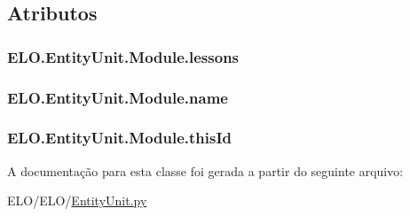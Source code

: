 \subsection{Atributos}
\hypertarget{classELO_1_1EntityUnit_1_1Module_a33eacfd2527f80841b87ccd73eb5fec0}{
\subsubsection[{lessons}]{\setlength{\rightskip}{0pt plus 5cm}E\-L\-O.\-Entity\-Unit.\-Module.\-lessons}}\label{classELO_1_1EntityUnit_1_1Module_a33eacfd2527f80841b87ccd73eb5fec0}
\hypertarget{classELO_1_1EntityUnit_1_1Module_a82adf3b2602714a4df5f0df535902854}{
\subsubsection[{name}]{\setlength{\rightskip}{0pt plus 5cm}E\-L\-O.\-Entity\-Unit.\-Module.\-name}}\label{classELO_1_1EntityUnit_1_1Module_a82adf3b2602714a4df5f0df535902854}
\hypertarget{classELO_1_1EntityUnit_1_1Module_a02fe16e41dd435364cb9073a8a805e96}{
\subsubsection[{this\-Id}]{\setlength{\rightskip}{0pt plus 5cm}E\-L\-O.\-Entity\-Unit.\-Module.\-this\-Id}}\label{classELO_1_1EntityUnit_1_1Module_a02fe16e41dd435364cb9073a8a805e96}


A documentação para esta classe foi gerada a partir do seguinte arquivo\-:\begin{DoxyCompactItemize}
\item 
E\-L\-O/\-E\-L\-O/\hyperlink{EntityUnit_8py}{Entity\-Unit.\-py}\end{DoxyCompactItemize}
